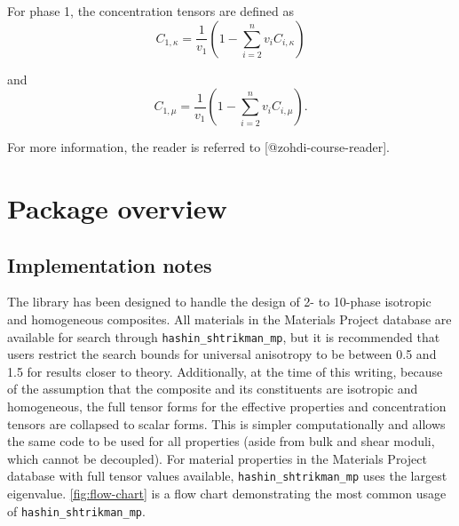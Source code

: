 For phase 1, the concentration tensors are defined as
\begin{equation}\label{eqn:sph-cf-1}
C_{1,\kappa} = \frac{1}{v_{1}} \left( 1 - \sum\limits_{i=2}^{n} v_{i} C_{i,\kappa} \right)
\end{equation}

and \begin{equation}\label{eqn:dev-cf-1}
C_{1,\mu} = \frac{1}{v_{1}} \left( 1 - \sum\limits_{i=2}^{n} v_{i} C_{i,\mu} \right).
\end{equation}

For more information, the reader is referred to
{[}@zohdi-course-reader{]}.

\section{Package overview}\label{package-overview}

\subsection{Implementation notes}\label{implementation-notes}

The library has been designed to handle the design of 2- to 10-phase
isotropic and homogeneous composites. All materials in the Materials
Project database are available for search through
\texttt{hashin\_shtrikman\_mp}, but it is recommended that users
restrict the search bounds for universal anisotropy to be between 0.5
and 1.5 for results closer to theory. Additionally, at the time of this
writing, because of the assumption that the composite and its
constituents are isotropic and homogeneous, the full tensor forms for
the effective properties and concentration tensors are collapsed to
scalar forms. This is simpler computationally and allows the same code
to be used for all properties (aside from bulk and shear moduli, which
cannot be decoupled). For material properties in the Materials Project
database with full tensor values available,
\texttt{hashin\_shtrikman\_mp} uses the largest eigenvalue.
\autoref{fig:flow-chart} is a flow chart demonstrating the most common
usage of \texttt{hashin\_shtrikman\_mp}.

